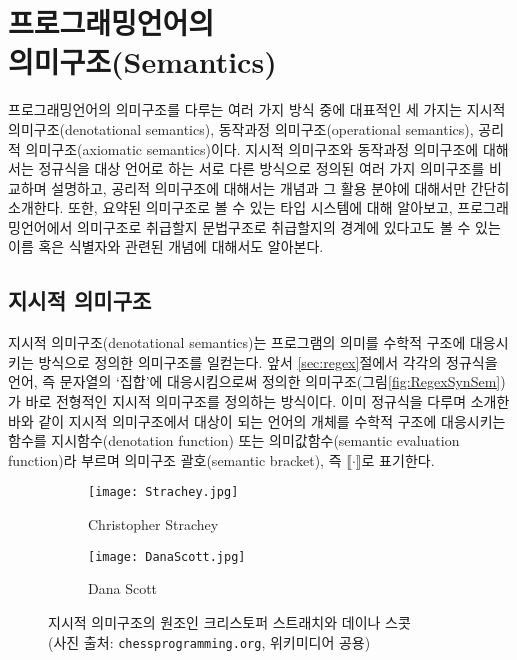\chapter[프로그래밍언어의 의미구조(Semantics)]{프로그래밍언어의\\의미구조(Semantics)}

프로그래밍언어의 의미구조를 다루는 여러 가지 방식 중에 대표적인
세 가지는 지시적 의미구조(denotational semantics),
동작과정 의미구조(operational semantics),
공리적 의미구조(axiomatic semantics)이다.
지시적 의미구조와 동작과정 의미구조에 대해서는 정규식을 대상 언어로 하는
서로 다른 방식으로 정의된 여러 가지 의미구조를 비교하며 설명하고,
공리적 의미구조에 대해서는 개념과 그 활용 분야에 대해서만 간단히 소개한다.
또한, 요약된 의미구조로 볼 수 있는 타입 시스템에 대해 알아보고,
프로그래밍언어에서 의미구조로 취급할지 문법구조로 취급할지의 경계에
있다고도 볼 수 있는 이름 혹은 식별자와 관련된 개념에 대해서도 알아본다.

\newpage

\section{지시적 의미구조}
%
%
%
%
지시적 의미구조(denotational semantics)는 프로그램의 의미를 수학적 구조에
대응시키는 방식으로 정의한 의미구조를 일컫는다. 앞서 \ref{sec:regex}절에서
각각의 정규식을 언어, 즉 문자열의 `집합'에 대응시킴으로써 정의한 
의미구조(그림\;\ref{fig:RegexSynSem})가 바로 전형적인 지시적 의미구조를
정의하는 방식이다. 이미 정규식을 다루며 소개한 바와 같이 지시적 의미구조에서
대상이 되는 언어의 개체를 수학적 구조에 대응시키는 함수를 지시함수(denotation function)
또는 의미값함수(semantic evaluation function)라 부르며 의미구조 괄호(semantic bracket),
즉 $\llbracket\cdot\rrbracket$로 표기한다.

\begin{figure}\centering
\begin{subfigure}{.3\textwidth}\centering\vspace*{-2ex}
\texttt{[image: Strachey.jpg]}
\caption{Christopher Strachey}
\end{subfigure}
\qquad\qquad
\begin{subfigure}{.3\textwidth}\centering\vspace*{-2ex}
\texttt{[image: DanaScott.jpg]}
\caption{Dana Scott}
\end{subfigure}
\caption{지시적 의미구조의 원조인
         크리스토퍼 스트래치와 데이나 스콧 \\
         {\footnotesize(사진 출처:
              \texttt{chessprogramming.org}, 위키미디어 공용)}
	 \label{fig:StracheyScott} }
\end{figure}

